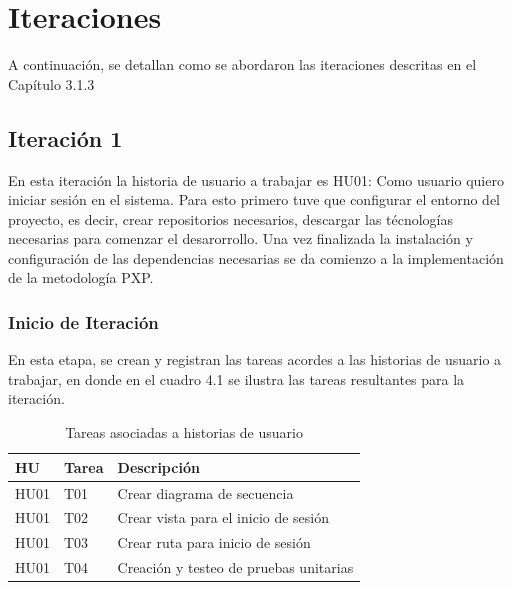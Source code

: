 ﻿\documentclass{iccmemoria}
\begin{document}
\section{Iteraciones}
A continuación, se detallan como se abordaron las iteraciones descritas en el Capítulo 3.1.3

\subsection{Iteración 1}
En esta iteración la historia de usuario a trabajar es HU01: Como usuario quiero iniciar sesión en el sistema. Para esto primero tuve que configurar el entorno del proyecto, es decir, crear repositorios necesarios, descargar las técnologías necesarias para comenzar el desarorrollo. Una vez finalizada la instalación y configuración de las dependencias necesarias se da comienzo a la implementación de la metodología PXP.  

\subsubsection{Inicio de Iteración}
En esta etapa, se crean y registran las tareas acordes a las historias de usuario a trabajar, en donde en el cuadro 4.1 se ilustra las tareas resultantes para la iteración.

\begin{table}[H]
    \centering
    \caption{Tareas asociadas a historias de usuario}
    \label{tab:tareas_historias_de_usuario} 
    
    \begin{tabular}{|p{2cm}|p{2cm}|p{7cm}|} 
        \hline %
        
        \textbf{HU } & \textbf{Tarea} & \textbf{Descripción}\\
        \hline %
        
HU01 & T01 & Crear diagrama de secuencia\\
\hline
HU01 & T02 & Crear vista para el inicio de sesión\\
\hline
HU01 & T03 & Crear ruta para inicio de sesión\\
\hline
HU01 & T04 & Creación y testeo de pruebas unitarias\\

        \hline %
    \end{tabular}
\end{table}
\end{document}
